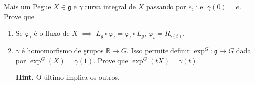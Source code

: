 \begin{thing6}{Mais um}\leavevmode
Pegue \(X \in \mathfrak{g}\) e \(\gamma\) curva integral de \(X\) passando por \(e\), i.e. \(\gamma(0)=e\). Prove que
\begin{enumerate}
\item Se \(\varphi_t\) é o fluxo de \(X\) \(\implies\) \(L_g \circ\varphi_t = \varphi_t\circ L_g\), \(\varphi_t = R_{\gamma(t)}\).
\item \(\gamma\) é homomorfismo de grupos \(\mathbb{R} \to G\). Isso permite definir \(\operatorname{exp}^G: \mathfrak{g} \to G\) dada por \(\operatorname{exp}^G(X)=\gamma(1)\). Prove que \(\operatorname{exp}^G(tX)=\gamma(t)\).

\textbf{Hint.} O último implica os outros.
\end{enumerate}
\end{thing6}

